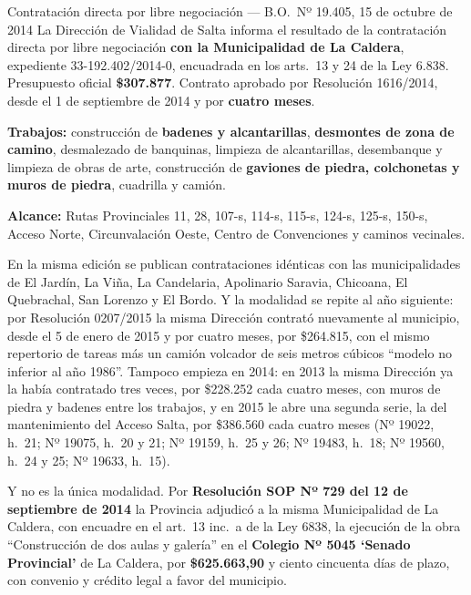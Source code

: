 \begin{ficha}{Contratación directa por libre negociación --- B.O.\ Nº 19.405, 15 de octubre de 2014}
La Dirección de Vialidad de Salta informa el resultado de la contratación directa por libre negociación \textbf{con la Municipalidad de La Caldera}, expediente 33-192.402/2014-0, encuadrada en los arts.\ 13 y 24 de la Ley 6.838. Presupuesto oficial \textbf{\$307.877}. Contrato aprobado por Resolución 1616/2014, desde el 1 de septiembre de 2014 y por \textbf{cuatro meses}.

\textbf{Trabajos:} construcción de \textbf{badenes y alcantarillas}, \textbf{desmontes de zona de camino}, desmalezado de banquinas, limpieza de alcantarillas, desembanque y limpieza de obras de arte, construcción de \textbf{gaviones de piedra, colchonetas y muros de piedra}, cuadrilla y camión.

\textbf{Alcance:} Rutas Provinciales 11, 28, 107-s, 114-s, 115-s, 124-s, 125-s, 150-s, Acceso Norte, Circunvalación Oeste, Centro de Convenciones y caminos vecinales.

En la misma edición se publican contrataciones idénticas con las municipalidades de El Jardín, La Viña, La Candelaria, Apolinario Saravia, Chicoana, El Quebrachal, San Lorenzo y El Bordo. Y la modalidad se repite al año siguiente: por Resolución 0207/2015 la misma Dirección contrató nuevamente al municipio, desde el 5 de enero de 2015 y por cuatro meses, por \$264.815, con el mismo repertorio de tareas más un camión volcador de seis metros cúbicos ``modelo no inferior al año 1986''. Tampoco empieza en 2014: en 2013 la misma Dirección ya la había contratado tres veces, por \$228.252 cada cuatro meses, con muros de piedra y badenes entre los trabajos, y en 2015 le abre una segunda serie, la del mantenimiento del Acceso Salta, por \$386.560 cada cuatro meses (Nº 19022, h.\ 21; Nº 19075, h.\ 20 y 21; Nº 19159, h.\ 25 y 26; Nº 19483, h.\ 18; Nº 19560, h.\ 24 y 25; Nº 19633, h.\ 15).

Y no es la única modalidad. Por \textbf{Resolución SOP Nº 729 del 12 de septiembre de 2014} la Provincia adjudicó a la misma Municipalidad de La Caldera, con encuadre en el art.\ 13 inc.\ a de la Ley 6838, la ejecución de la obra ``Construcción de dos aulas y galería'' en el \textbf{Colegio Nº 5045 `Senado Provincial'} de La Caldera, por \textbf{\$625.663,90} y ciento cincuenta días de plazo, con convenio y crédito legal a favor del municipio.


\end{ficha}
